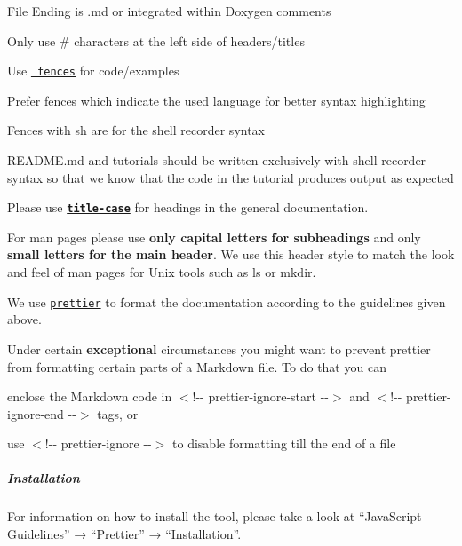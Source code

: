 \begin{DoxyItemize}
\item File Ending is {\ttfamily .md} or integrated within Doxygen comments
\item Only use {\ttfamily \#} characters at the left side of headers/titles
\item Use \href{https://help.github.com/en/articles/creating-and-highlighting-code-blocks}{\texttt{ fences}} for code/examples
\item Prefer fences which indicate the used language for better syntax highlighting
\item Fences with sh are for the shell recorder syntax
\item {\ttfamily R\+E\+A\+D\+M\+E.\+md} and tutorials should be written exclusively with shell recorder syntax so that we know that the code in the tutorial produces output as expected
\item Please use \href{https://en.wiktionary.org/wiki/title_case}{\texttt{ {\bfseries{title-\/case}}}} for headings in the general documentation.
\item For man pages please use {\bfseries{only capital letters for subheadings}} and only {\bfseries{small letters for the main header}}. We use this header style to match the look and feel of man pages for Unix tools such as {\ttfamily ls} or {\ttfamily mkdir}.
\end{DoxyItemize}

We use \href{https://prettier.io}{\texttt{ {\ttfamily prettier}}} to format the documentation according to the guidelines given above.

Under certain {\bfseries{exceptional}} circumstances you might want to prevent {\ttfamily prettier} from formatting certain parts of a Markdown file. To do that you can


\begin{DoxyItemize}
\item enclose the Markdown code in {\ttfamily $<$!-\/-\/ prettier-\/ignore-\/start -\/-\/$>$} and {\ttfamily $<$!-\/-\/ prettier-\/ignore-\/end -\/-\/$>$} tags, or
\item use {\ttfamily $<$!-\/-\/ prettier-\/ignore -\/-\/$>$} to disable formatting till the end of a file
\end{DoxyItemize}

\label{doc_CODING_md_autotoc_md1003}%
%
\subparagraph*{Installation}

For information on how to install the tool, please take a look at “\+Java\+Script Guidelines” → “\+Prettier” → “\+Installation”.

